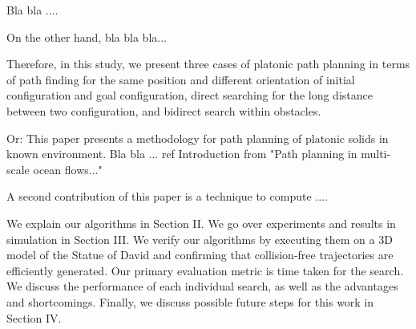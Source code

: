 Bla bla ....

On the other hand, bla bla bla...

Therefore, in this study, we present three cases of platonic path planning in terms of path finding for the same position and different orientation of initial configuration and goal configuration, direct searching for the long distance between two configuration, and bidirect search within obstacles.

Or: This paper presents a methodology for path planning of platonic solids in known environment. Bla bla ... ref Introduction from "Path planning in multi-scale ocean flows..."

A second contribution of this paper is a technique to compute .... 


We explain our algorithms in Section II. We go over experiments and results in simulation in Section III. We verify our algorithms by executing them on a 3D model of the Statue of David and confirming that collision-free trajectories are efficiently generated. Our primary evaluation metric is time taken for the search. We discuss the performance of each individual search, as well as the advantages and shortcomings. Finally, we discuss possible future steps for this work in Section IV.\\

